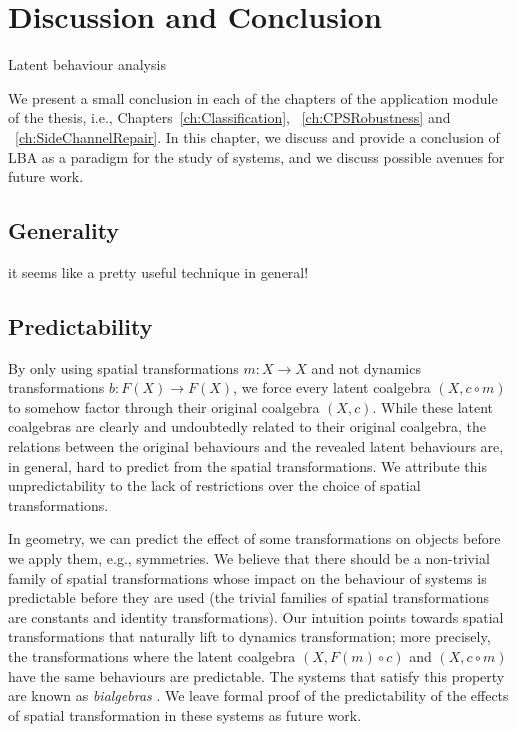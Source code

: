 \chapter{Discussion and Conclusion}
Latent behaviour analysis 

We present a small conclusion in each of the chapters of the application module of the thesis, i.e., Chapters~\ref{ch:Classification}, ~\ref{ch:CPSRobustness} and ~\ref{ch:SideChannelRepair}. In this chapter, we discuss and provide a conclusion of LBA as a paradigm for the study of systems, and we discuss possible avenues for future work.

\section{Generality}
it seems like a pretty useful technique in general! 



\section{Predictability} 
By only using spatial transformations $m\colon X\rightarrow X$ and not dynamics transformations $b\colon F(X)\rightarrow F(X)$, we force every latent coalgebra $(X,c\circ m)$ to somehow factor through their original coalgebra $(X,c)$. While these latent coalgebras are clearly and undoubtedly related to their original coalgebra, the relations between the original behaviours and the revealed latent behaviours are, in general, hard to predict from the spatial transformations. We attribute this unpredictability to the lack of restrictions over the choice of spatial transformations. 

In geometry, we can predict the effect of some transformations on objects before we apply them, e.g., symmetries. We believe that there should be a non-trivial family of spatial transformations whose impact on the behaviour of systems is predictable before they are used (the trivial families of spatial transformations are constants and identity transformations). Our intuition points towards spatial transformations that naturally lift to dynamics transformation; more precisely, the transformations where the latent coalgebra $(X, F(m)\circ c)$ and $(X,c\circ m)$ have the same behaviours are predictable. The systems that satisfy this property are known as \emph{bialgebras} \cite{JacobsBook}. We leave formal proof of the predictability of the effects of spatial transformation in these systems as future work.

